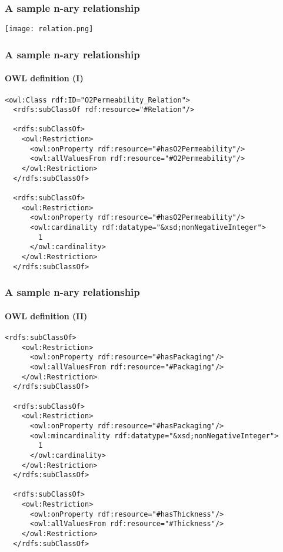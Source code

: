 \documentclass{beamer}
\begin{document}
\begin{frame}
  \frametitle{A sample n-ary relationship}

  \begin{center}
    \texttt{[image: relation.png]}
  \end{center}
\end{frame}

\begin{frame}[fragile]
  \frametitle{A sample n-ary relationship}
  \framesubtitle{OWL definition (I)}

  \begin{Verbatim}[fontsize=\scriptsize]
<owl:Class rdf:ID="O2Permeability_Relation">
  <rdfs:subClassOf rdf:resource="#Relation"/>

  <rdfs:subClassOf>
    <owl:Restriction>
      <owl:onProperty rdf:resource="#hasO2Permeability"/>
      <owl:allValuesFrom rdf:resource="#O2Permeability"/>
    </owl:Restriction>
  </rdfs:subClassOf>

  <rdfs:subClassOf>
    <owl:Restriction>
      <owl:onProperty rdf:resource="#hasO2Permeability"/>
      <owl:cardinality rdf:datatype="&xsd;nonNegativeInteger">
        1
      </owl:cardinality>
    </owl:Restriction>
  </rdfs:subClassOf>
  \end{Verbatim}
\end{frame}

\begin{frame}[fragile]
  \frametitle{A sample n-ary relationship}
  \framesubtitle{OWL definition (II)}

  \begin{Verbatim}[fontsize=\scriptsize]
  <rdfs:subClassOf>
    <owl:Restriction>
      <owl:onProperty rdf:resource="#hasPackaging"/>
      <owl:allValuesFrom rdf:resource="#Packaging"/>
    </owl:Restriction>
  </rdfs:subClassOf>

  <rdfs:subClassOf>
    <owl:Restriction>
      <owl:onProperty rdf:resource="#hasPackaging"/>
      <owl:mincardinality rdf:datatype="&xsd;nonNegativeInteger">
        1
      </owl:cardinality>
    </owl:Restriction>
  </rdfs:subClassOf>

  <rdfs:subClassOf>
    <owl:Restriction>
      <owl:onProperty rdf:resource="#hasThickness"/>
      <owl:allValuesFrom rdf:resource="#Thickness"/>
    </owl:Restriction>
  </rdfs:subClassOf>
  \end{Verbatim}
\end{frame}
\end{document}
